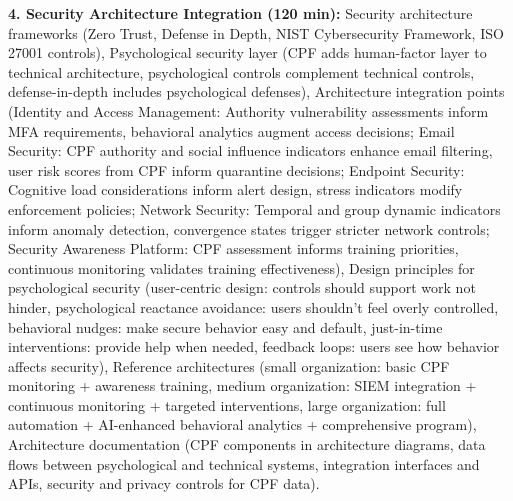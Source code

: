 \documentclass[11pt,a4paper]{article}
\begin{document}
\textbf{4. Security Architecture Integration (120 min):} Security architecture frameworks (Zero Trust, Defense in Depth, NIST Cybersecurity Framework, ISO 27001 controls), Psychological security layer (CPF adds human-factor layer to technical architecture, psychological controls complement technical controls, defense-in-depth includes psychological defenses), Architecture integration points (Identity and Access Management: Authority vulnerability assessments inform MFA requirements, behavioral analytics augment access decisions; Email Security: CPF authority and social influence indicators enhance email filtering, user risk scores from CPF inform quarantine decisions; Endpoint Security: Cognitive load considerations inform alert design, stress indicators modify enforcement policies; Network Security: Temporal and group dynamic indicators inform anomaly detection, convergence states trigger stricter network controls; Security Awareness Platform: CPF assessment informs training priorities, continuous monitoring validates training effectiveness), Design principles for psychological security (user-centric design: controls should support work not hinder, psychological reactance avoidance: users shouldn't feel overly controlled, behavioral nudges: make secure behavior easy and default, just-in-time interventions: provide help when needed, feedback loops: users see how behavior affects security), Reference architectures (small organization: basic CPF monitoring + awareness training, medium organization: SIEM integration + continuous monitoring + targeted interventions, large organization: full automation + AI-enhanced behavioral analytics + comprehensive program), Architecture documentation (CPF components in architecture diagrams, data flows between psychological and technical systems, integration interfaces and APIs, security and privacy controls for CPF data).
\end{document}
